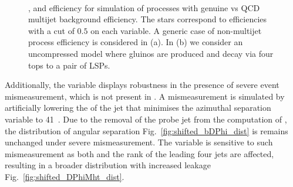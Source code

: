 \begin{figure}[!h]
 \centering
 ~
  \\
 \caption{\bdphi, \dphimhtj and \dphimhtjall efficiency for simulation of processes with genuine
 \met vs QCD multijet background efficiency. The stars correspond to
 efficiencies with a cut of $0.5$ on each variable. A generic case of
 non-multijet process efficiency is considered in (a). In (b) we
 consider an uncompressed \SUSY model where gluinos are produced and
 decay via four tops to a pair of \acp{LSP}. 
 }
 \label{fig:bDPhi_roc}
\end{figure}

Additionally, the \bdphi variable displays robustness in the presence
of severe event mismeasurement, which is not present in \dphimhtj. A
mismeasurement is simulated by artificially lowering the \pt of the
jet that minimises the azimuthal separation variable to 41~\gev. Due
to the removal of the probe jet from the computation of \bdphi, the
distribution of angular separation Fig.~\ref{fig:shifted_bDPhi_dist}
is remains unchanged under severe mismeasurement. The \dphimhtj
variable is sensitive to such mismeasurement as both \mht and the rank
of the leading four jets are affected, resulting in a broader
distribution with increased leakage
Fig.~\ref{fig:shifted_DPhiMht_dist}.

